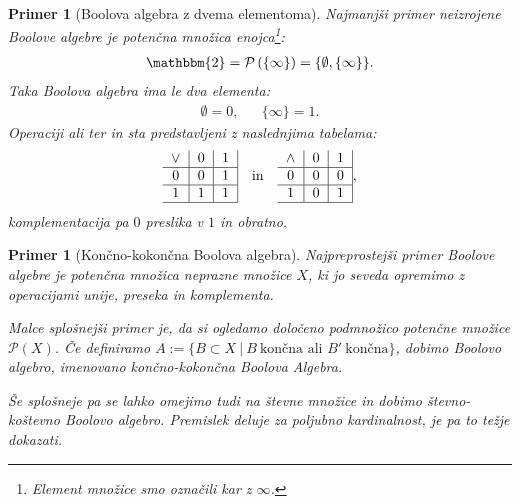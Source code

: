 \documentclass{amsart}
\newtheorem{primer}[izrek]{Primer}
\begin{document}
\begin{primer}[Boolova algebra z dvema elementoma]
    Najmanjši primer neizrojene Boolove algebre je potenčna množica enojca\footnote{Element množice smo označili kar z \(\infty\).}:
    \begin{align*}
        \mathbbm{2} = \mathcal{P}\left(\{\infty\}\right) = \{\emptyset, \{\infty\}\}.
    \end{align*}
    Taka Boolova algebra ima le dva elementa:
    \begin{align*}
        \emptyset = 0, && \{\infty\} = 1.
    \end{align*}
    Operaciji \textit{ali} ter \textit{in} sta predstavljeni z naslednjima tabelama:
    \begin{align*}
    \begin{tabular}{c|c|c|}
        \(\vee\) & $0$ & $1$ \\
        \hline
        $0$ & \(0\) &$1$ \\
        \hline
        $1$ & \(1\) & $1$ \\
        \hline
    \end{tabular}&& \text{in} &&
    \begin{tabular}{c|c|c|}
        \(\wedge\) & $0$ & $1$ \\
        \hline
        $0$ & $0$ &$0$ \\
        \hline
        $1$ & $0$ & $1$ \\
        \hline
    \end{tabular},
\end{align*}
komplementacija pa $0$ preslika v $1$ in obratno.
\end{primer}

\begin{primer}[Končno-kokončna Boolova algebra]
    Najpreprostejši primer Boolove algebre je potenčna množica neprazne množice \(X\), ki jo seveda opremimo z operacijami unije,
    preseka in komplementa. 
    
    Malce splošnejši primer je, da si ogledamo določeno podmnožico potenčne množice \(\mathcal{P}\left(X\right)\).
    Če definiramo \(A := \{B \subset X~|~B~\text{končna  ali } B'~\text{končna}\}\), dobimo Boolovo algebro, imenovano
    končno-kokončna Boolova Algebra.

    Še splošneje pa se lahko omejimo tudi na števne množice in dobimo števno-koštevno Boolovo algebro.
    Premislek deluje za poljubno kardinalnost, je pa to težje dokazati.
\end{primer}
\end{document}
